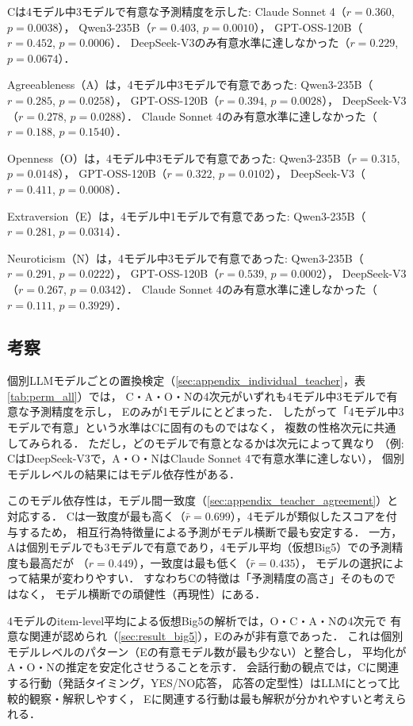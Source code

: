 \documentclass[dvipdfmx,11pt,a4paper]{bxjsarticle}
\renewcommand{\_}{\paperorigunderscore\allowbreak}%
\begin{document}
Cは4モデル中3モデルで有意な予測精度を示した:
Claude Sonnet 4（$r = 0.360$, $p = 0.0038$），
Qwen3-235B（$r = 0.403$, $p = 0.0010$），
GPT-OSS-120B（$r = 0.452$, $p = 0.0006$）．
DeepSeek-V3のみ有意水準に達しなかった（$r = 0.229$, $p = 0.0674$）．

Agreeableness（A）は，4モデル中3モデルで有意であった:
Qwen3-235B（$r = 0.285$, $p = 0.0258$），
GPT-OSS-120B（$r = 0.394$, $p = 0.0028$），
DeepSeek-V3（$r = 0.278$, $p = 0.0288$）．
Claude Sonnet 4のみ有意水準に達しなかった（$r = 0.188$, $p = 0.1540$）．

Openness（O）は，4モデル中3モデルで有意であった:
Qwen3-235B（$r = 0.315$, $p = 0.0148$），
GPT-OSS-120B（$r = 0.322$, $p = 0.0102$），
DeepSeek-V3（$r = 0.411$, $p = 0.0008$）．

Extraversion（E）は，4モデル中1モデルで有意であった:
Qwen3-235B（$r = 0.281$, $p = 0.0314$）．

Neuroticism（N）は，4モデル中3モデルで有意であった:
Qwen3-235B（$r = 0.291$, $p = 0.0222$），
GPT-OSS-120B（$r = 0.539$, $p = 0.0002$），
DeepSeek-V3（$r = 0.267$, $p = 0.0342$）．
Claude Sonnet 4のみ有意水準に達しなかった（$r = 0.111$, $p = 0.3929$）．

\subsection{考察}

個別LLMモデルごとの置換検定（\ref{sec:appendix_individual_teacher}，表\ref{tab:perm_all}）では，
C・A・O・Nの4次元がいずれも4モデル中3モデルで有意な予測精度を示し，
Eのみが1モデルにとどまった．
したがって「4モデル中3モデルで有意」という水準はCに固有のものではなく，
複数の性格次元に共通してみられる．
ただし，どのモデルで有意となるかは次元によって異なり
（例: CはDeepSeek-V3で，A・O・NはClaude Sonnet 4で有意水準に達しない），
個別モデルレベルの結果にはモデル依存性がある．

このモデル依存性は，モデル間一致度（\ref{sec:appendix_teacher_agreement}）と対応する．
Cは一致度が最も高く（$\bar{r} = 0.699$），4モデルが類似したスコアを付与するため，
相互行為特徴量による予測がモデル横断で最も安定する．
一方，Aは個別モデルでも3モデルで有意であり，4モデル平均（仮想Big5）での予測精度も最高だが
（$r = 0.449$），一致度は最も低く（$\bar{r} = 0.435$），
モデルの選択によって結果が変わりやすい．
すなわちCの特徴は「予測精度の高さ」そのものではなく，
モデル横断での頑健性（再現性）にある．

4モデルのitem-level平均による仮想Big5の解析では，O・C・A・Nの4次元で
有意な関連が認められ（\ref{sec:result_big5}），Eのみが非有意であった．
これは個別モデルレベルのパターン（Eの有意モデル数が最も少ない）と整合し，
平均化がA・O・Nの推定を安定化させうることを示す．
会話行動の観点では，Cに関連する行動（発話タイミング，YES/NO応答，
応答の定型性）はLLMにとって比較的観察・解釈しやすく，
Eに関連する行動は最も解釈が分かれやすいと考えられる．
\end{document}
